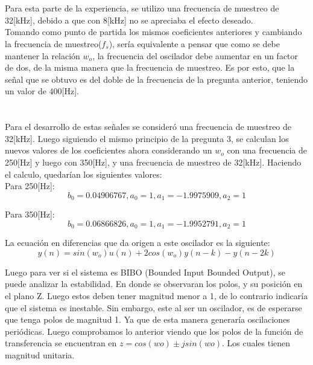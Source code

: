 \documentclass[11pt, letterpaper, titlepage]{article}
\begin{document}



\section{}%
Para esta parte de la experiencia, se utilizo una frecuencia de muestreo de 32[kHz], debido a que con 8[kHz] no se apreciaba el efecto deseado.\\

Tomando como punto de partida los mismos coeficientes anteriores y cambiando la frecuencia de muestreo($f_s$), sería equivalente a pensar que como se debe mantener la relación $w_o$, la frecuencia del oscilador debe aumentar en un factor de dos, de la misma manera que la frecuencia de muestreo. Es por esto, que la señal que se obtuvo es del doble de la frecuencia de la pregunta anterior, teniendo un valor de 400[Hz].


\section{}%
Para el desarrollo de estas señales se consideró una frecuencia de muestreo de 32[kHz]. Luego siguiendo el mismo principio de la pregunta 3, se calculan los nuevos valores de los coeficientes ahora considerando un $w_o$ con una frecuencia de 250[Hz] y luego con 350[Hz], y una frecuencia de muestreo de 32[kHz]. Haciendo el calculo, quedarían los siguientes valores:\\

Para 250[Hz]:
$$b_0=0.04906767, a_0=1, a_1=-1.9975909, a_2=1$$

Para 350[Hz]:
$$b_0=0.06866826, a_0=1, a_1=-1.9952791, a_2=1$$

La ecuación en diferencias que da origen a este oscilador es la siguiente:
$$y(n)=sin(w_o)u(n)+2cos(w_o)y(n-k)-y(n-2k)$$

Luego para ver si el sistema es BIBO (Bounded Input Bounded Output), se puede analizar la estabilidad. En donde se observaran los polos, y su posición en el plano Z. Luego estos deben tener magnitud menor a 1, de lo contrario indicaría que el sistema es inestable. Sin embargo, este al ser un oscilador, es de esperarse que tenga polos de magnitud 1. Ya que de esta manera generaría oscilaciones periódicas. Luego comprobamos lo anterior viendo que los polos de la función de transferencia se encuentran en $z=cos(wo)\pm jsin(wo)$. Los cuales tienen magnitud unitaria.
\end{document}
